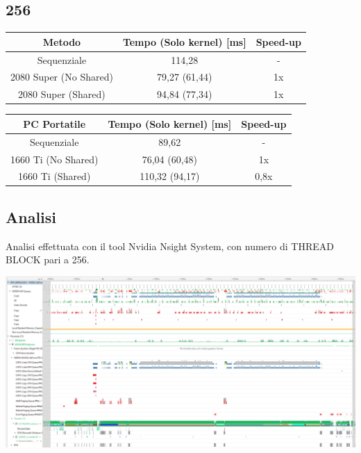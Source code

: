 \documentclass[12pt,a4paper]{report}
\begin{document}
			\subsection{256}
			
				\begin{tabular}{|c|c|c|}
					\hline
					Metodo & Tempo (Solo kernel) [ms] & Speed-up \\
					\hline
					Sequenziale & 114,28 & -  \\
					\hline
					2080 Super (No Shared) & 79,27 (61,44) & 1x \\
					\hline
					2080 Super (Shared) & 94,84 (77,34) & 1x \\
					\hline
				\end{tabular}
				
				\bigbreak
				
				\begin{tabular}{|c|c|c|}
					\hline
					PC Portatile & Tempo (Solo kernel) [ms] & Speed-up \\
					\hline
					Sequenziale & 89,62 & -  \\
					\hline
					1660 Ti (No Shared) & 76,04 (60,48) & 1x \\
					\hline
					1660 Ti (Shared) & 110,32 (94,17) & 0,8x \\
					\hline
				\end{tabular}
			
			\subsection{Analisi}
			
				Analisi effettuata con il tool Nvidia Nsight System, con numero di THREAD BLOCK pari a 256.
				
				\begin{center}
					\includegraphics[width=1\linewidth]{Tool}
				\end{center}
	
\end{document}
